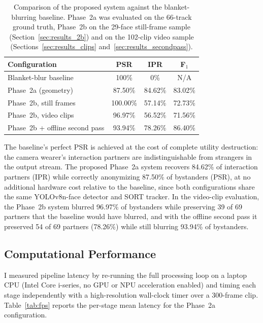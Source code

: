 \begin{table}[htbp]
\begin{singlespace}
\centering
\caption{Comparison of the proposed system against the blanket-blurring baseline.
Phase~2a was evaluated on the 66-track ground truth, Phase~2b on the 29-face
still-frame sample (Section~\ref{sec:results_2b}) and on the 102-clip video sample
(Sections~\ref{sec:results_clips} and~\ref{sec:results_secondpass}).}
\label{tab:vs_baseline}
\renewcommand{\arraystretch}{1.3}
\begin{tabular}{@{}lccc@{}}
\toprule
\textbf{Configuration} & \textbf{PSR} & \textbf{IPR} & \textbf{F$_1$} \\
\midrule
Blanket-blur baseline      & 100\%   & 0\%     & N/A \\
Phase~2a (geometry)        & 87.50\% & 84.62\% & 83.02\% \\
Phase~2b, still frames     & 100.00\% & 57.14\% & 72.73\% \\
Phase~2b, video clips      & 96.97\% & 56.52\% & 71.56\% \\
Phase~2b + offline second pass & 93.94\% & 78.26\% & 86.40\% \\
\bottomrule
\end{tabular}
\end{singlespace}
\end{table}

The baseline's perfect PSR is achieved at the cost of complete utility destruction:
the camera wearer's interaction partners are indistinguishable from strangers in the
output stream. The proposed Phase~2a system recovers 84.62\% of interaction partners
(IPR) while correctly anonymizing 87.50\% of bystanders (PSR), at no additional
hardware cost relative to the baseline, since both configurations share the same
YOLOv8n-face detector and SORT tracker. In the video-clip evaluation, the Phase~2b
system blurred 96.97\% of bystanders while preserving 39 of 69 partners that the
baseline would have blurred, and with the offline second pass it preserved 54 of
69 partners (78.26\%) while still blurring 93.94\% of bystanders.

\subsection{Computational Performance}
\label{sec:fps}

I measured pipeline latency by re-running the full processing loop on a laptop
CPU (Intel Core i-series, no GPU or NPU acceleration enabled) and timing each stage
independently with a high-resolution wall-clock timer over a 300-frame clip. Table~\ref{tab:fps}
reports the per-stage mean latency for the Phase~2a configuration.

